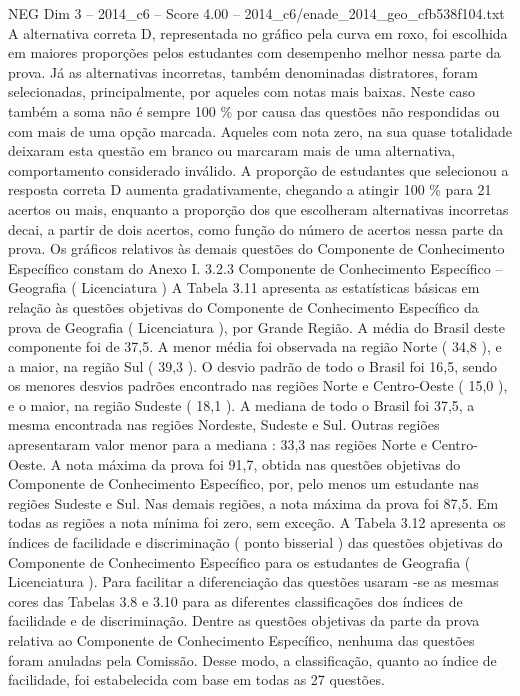 \begin{textsample}{NEG Dim 3 – 2014\_c6 – Score 4.00 – 2014\_c6/enade\_2014\_geo\_cfb538f104.txt}
A alternativa correta D, representada no gráfico pela curva em roxo, foi escolhida em maiores proporções pelos estudantes com desempenho melhor nessa parte da prova.
Já as alternativas incorretas, também denominadas distratores, foram selecionadas, principalmente, por aqueles com notas mais baixas.
Neste caso também a soma não é sempre 100 \% por causa das questões não respondidas ou com mais de uma opção marcada.
Aqueles com nota zero, na sua quase totalidade deixaram esta questão em branco ou marcaram mais de uma alternativa, comportamento considerado inválido.
A proporção de estudantes que selecionou a resposta correta D aumenta gradativamente, chegando a atingir 100 \% para 21 acertos ou mais, enquanto a proporção dos que escolheram alternativas incorretas decai, a partir de dois acertos, como função do número de acertos nessa parte da prova.
Os gráficos relativos às demais questões do Componente de Conhecimento Específico constam do Anexo I. 3.2.3 Componente de Conhecimento Específico – Geografia ( Licenciatura ) A Tabela 3.11 apresenta as estatísticas básicas em relação às questões objetivas do Componente de Conhecimento Específico da prova de Geografia ( Licenciatura ), por Grande Região.
A média do Brasil deste componente foi de 37,5.
A menor média foi observada na região Norte ( 34,8 ), e a maior, na região Sul ( 39,3 ).
O desvio padrão de todo o Brasil foi 16,5, sendo os menores desvios padrões encontrado nas regiões Norte e Centro-Oeste ( 15,0 ), e o maior, na região Sudeste ( 18,1 ).
A mediana de todo o Brasil foi 37,5, a mesma encontrada nas regiões Nordeste, Sudeste e Sul.
Outras regiões apresentaram valor menor para a mediana : 33,3 nas regiões Norte e Centro-Oeste.
A nota máxima da prova foi 91,7, obtida nas questões objetivas do Componente de Conhecimento Específico, por, pelo menos um estudante nas regiões Sudeste e Sul.
Nas demais regiões, a nota máxima da prova foi 87,5.
Em todas as regiões a nota mínima foi zero, sem exceção.
A Tabela 3.12 apresenta os índices de facilidade e discriminação ( ponto bisserial ) das questões objetivas do Componente de Conhecimento Específico para os estudantes de Geografia ( Licenciatura ).
Para facilitar a diferenciação das questões usaram -se as mesmas cores das Tabelas 3.8 e 3.10 para as diferentes classificações dos índices de facilidade e de discriminação.
Dentre as questões objetivas da parte da prova relativa ao Componente de Conhecimento Específico, nenhuma das questões foram anuladas pela Comissão.
Desse modo, a classificação, quanto ao índice de facilidade, foi estabelecida com base em todas as 27 questões.

\end{textsample}
